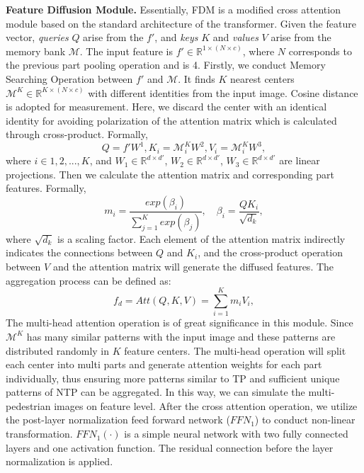 \documentclass[10pt,twocolumn,letterpaper]{article}
\begin{document}
\textbf{Feature Diffusion Module.}
Essentially, FDM is a modified cross attention module based on the standard architecture of the transformer\cite{vaswani2017attention}. 
Given the feature vector, \emph{queries} $Q$ arise from the $f'$, and \emph{keys} $K$ and \emph{values} $V$ arise from the memory bank $\mathcal{M}$. 
The input feature is $f' \in \mathbb{R}^{1 \times (N \times c)}$, where $N$ corresponds to the previous part pooling operation and is 4.
Firstly, we conduct Memory Searching Operation between $f'$ and $\mathcal{M}$. It finds $K$ nearest centers $\mathcal{M}^K \in \mathbb{R}^{K \times (N \times c)}$ with different identities from the input image. Cosine distance is adopted for measurement. Here, we discard the center with an identical identity for avoiding polarization of the attention matrix which is calculated through cross-product. 
Formally, 
\begin{equation}
    Q = f' W^1, K_i = \mathcal{M}^K_i W^2, V_i = \mathcal{M}^K_i W^3,
\end{equation}
where $i\in1,2,...,K$, and $W_1 \in \mathbb{R}^{d \times d'}$, $W_2 \in \mathbb{R}^{d \times d'}$, $W_3 \in \mathbb{R}^{d \times d'}$ are linear projections. Then we calculate the attention matrix and corresponding part features. Formally, 
\begin{equation}
   m_{i}=\frac{exp(\beta_{i})}{\sum_{j=1}^{K}exp(\beta_{j})}, \quad \beta_i=\frac{QK_i}{\sqrt{d_k}},
\end{equation}
where $\sqrt{d_k}$ is a scaling factor. Each element of the attention matrix indirectly indicates the connections between $Q$ and $K_i$, and the cross-product operation between $V$ and the attention matrix will generate the diffused features. 
The aggregation process can be defined as:
\begin{equation}
    f_{d} = Att(Q, K, V) = \sum_{i=1}^{K}m_i V_i,
\end{equation}
The multi-head attention operation is of great significance in this module. Since $\mathcal{M}^K$ has many similar patterns with the input image and these patterns are distributed randomly in $K$ feature centers. 
The multi-head operation will split each center into multi parts and generate attention weights for each part individually, thus ensuring more patterns similar to TP and sufficient unique patterns of NTP can be aggregated. 
In this way, we can simulate the multi-pedestrian images on feature level. 
After the cross attention operation, we utilize the post-layer normalization feed forward network ($FFN_1$) \cite{xiong2020layer} to conduct non-linear transformation. $FFN_1(\cdot)$ is a simple neural network with two fully connected layers and one activation function. The residual connection before the layer normalization is applied. 
\end{document}
